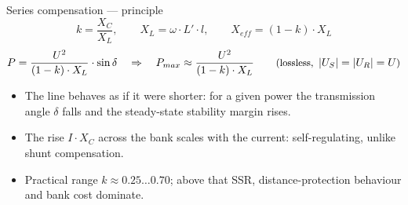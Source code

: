 %
%
\providecommand{\acfig}[1]{ac-transmission/fig/#1}


\begin{frame}{Series compensation --- principle}
  \setlength{\abovedisplayskip}{3pt}\setlength{\belowdisplayskip}{3pt}
  \[ k = \frac{X_C}{X_L}, \qquad X_L = \omega\cdot L'\cdot l,
     \qquad X_{eff} = \left(1-k\right)\cdot X_L \]
  \[ P = \frac{U^2}{\left(1-k\right)\cdot X_L}\cdot\sin\delta
     \quad\Rightarrow\quad
     P_{max} \approx \frac{U^2}{\left(1-k\right)\cdot X_L}
     \qquad\text{\small(lossless, } \left|U_S\right|=\left|U_R\right|=U\text{\small)} \]
  {\small
  \begin{itemize}
    \setlength{\itemsep}{0.2em}
    \item The line behaves as if it were shorter: for a given power the
          transmission angle $\delta$ falls and the steady-state stability
          margin rises.
    \item The rise $I\cdot X_C$ across the bank scales with the current:
          self-regulating, unlike shunt compensation.
    \item Practical range $k\approx0.25\ldots0.70$; above that SSR,
          distance-protection behaviour and bank cost dominate.
  \end{itemize}}
\end{frame}

